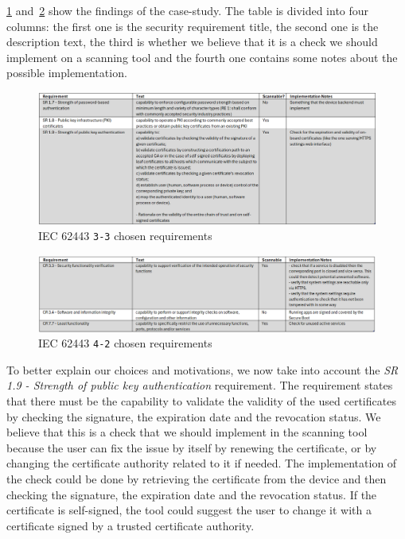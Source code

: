 \cref{fig:iec62443-findings-3_3} and~\cref{fig:iec62443-findings-4_2} show the findings of the case-study. The table is divided into four columns: the first one is the security requirement title, the second one is the description text, the third is whether we believe that it is a check we should implement on a scanning tool and the fourth one contains some notes about the possible implementation.

\begin{figure}[ht]
  \centering
  \includegraphics[width=1.0\textwidth]{chapters/04/assets/iec62443-findings-3_3}
  \caption{IEC 62443 \texttt{3-3} chosen requirements}
  \label{fig:iec62443-findings-3_3}
\end{figure}

\begin{figure}[ht]
  \centering
  \includegraphics[width=1.0\textwidth]{chapters/04/assets/iec62443-findings-4_2}
  \caption{IEC 62443 \texttt{4-2} chosen requirements}
  \label{fig:iec62443-findings-4_2}
\end{figure}

To better explain our choices and motivations, we now take into account the \textit{SR 1.9 - Strength of public key authentication} requirement. The requirement states that there must be the capability to validate the validity of the used certificates by checking the signature, the expiration date and the revocation status. We believe that this is a check that we should implement in the scanning tool because the user can fix the issue by itself by renewing the certificate, or by changing the certificate authority related to it if needed. The implementation of the check could be done by retrieving the certificate from the device and then checking the signature, the expiration date and the revocation status. If the certificate is self-signed, the tool could suggest the user to change it with a certificate signed by a trusted certificate authority.

